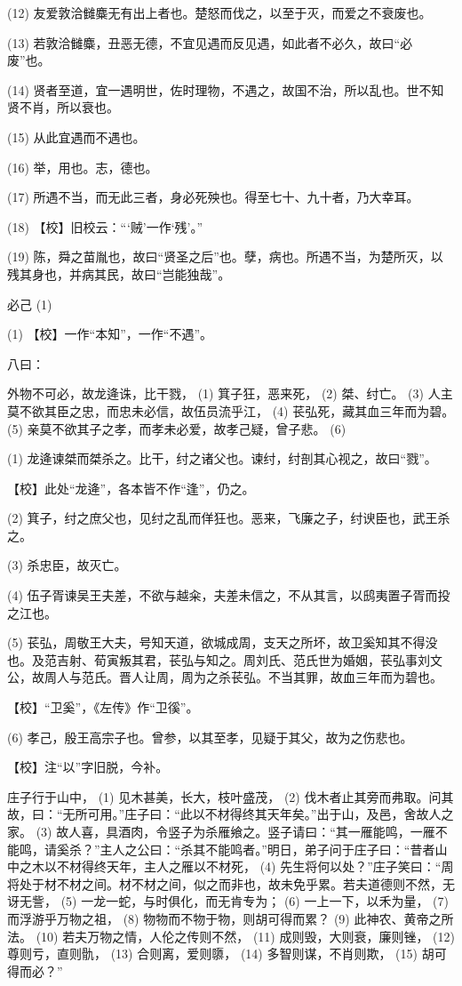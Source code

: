 \documentclass[12pt,UTF8]{ctexbook}
\begin{document}
(12) 友爱敦洽雠麋无有出上者也。楚怒而伐之，以至于灭，而爱之不衰废也。

(13) 若敦洽雠麋，丑恶无德，不宜见遇而反见遇，如此者不必久，故曰“必废”也。

(14) 贤者至道，宜一遇明世，佐时理物，不遇之，故国不治，所以乱也。世不知贤不肖，所以衰也。

(15) 从此宜遇而不遇也。

(16) 举，用也。志，德也。

(17) 所遇不当，而无此三者，身必死殃也。得至七十、九十者，乃大幸耳。

(18) 【校】旧校云：“‘贼’一作‘残’。”

(19) 陈，舜之苗胤也，故曰“贤圣之后”也。孽，病也。所遇不当，为楚所灭，以残其身也，并病其民，故曰“岂能独哉”。





必己 (1)


(1) 【校】一作“本知”，一作“不遇”。

八曰：

外物不可必，故龙逄诛，比干戮， (1) 箕子狂，恶来死， (2) 桀、纣亡。 (3) 人主莫不欲其臣之忠，而忠未必信，故伍员流乎江， (4) 苌弘死，藏其血三年而为碧。 (5) 亲莫不欲其子之孝，而孝未必爱，故孝己疑，曾子悲。 (6)

(1) 龙逄谏桀而桀杀之。比干，纣之诸父也。谏纣，纣剖其心视之，故曰“戮”。

【校】此处“龙逄”，各本皆不作“逢”，仍之。

(2) 箕子，纣之庶父也，见纣之乱而佯狂也。恶来，飞廉之子，纣谀臣也，武王杀之。

(3) 杀忠臣，故灭亡。

(4) 伍子胥谏吴王夫差，不欲与越籴，夫差未信之，不从其言，以鸱夷置子胥而投之江也。

(5) 苌弘，周敬王大夫，号知天道，欲城成周，支天之所坏，故卫奚知其不得没也。及范吉射、荀寅叛其君，苌弘与知之。周刘氏、范氏世为婚姻，苌弘事刘文公，故周人与范氏。晋人让周，周为之杀苌弘。不当其罪，故血三年而为碧也。

【校】“卫奚”，《左传》作“卫徯”。

(6) 孝己，殷王高宗子也。曾参，以其至孝，见疑于其父，故为之伤悲也。

【校】注“以”字旧脱，今补。

庄子行于山中， (1) 见木甚美，长大，枝叶盛茂， (2) 伐木者止其旁而弗取。问其故，曰：“无所可用。”庄子曰：“此以不材得终其天年矣。”出于山，及邑，舍故人之家。 (3) 故人喜，具酒肉，令竖子为杀雁飨之。竖子请曰：“其一雁能鸣，一雁不能鸣，请奚杀？”主人之公曰：“杀其不能鸣者。”明日，弟子问于庄子曰：“昔者山中之木以不材得终天年，主人之雁以不材死， (4) 先生将何以处？”庄子笑曰：“周将处于材不材之间。材不材之间，似之而非也，故未免乎累。若夫道德则不然，无讶无訾， (5) 一龙一蛇，与时俱化，而无肯专为； (6) 一上一下，以禾为量， (7) 而浮游乎万物之祖， (8) 物物而不物于物，则胡可得而累？ (9) 此神农、黄帝之所法。 (10) 若夫万物之情，人伦之传则不然， (11) 成则毁，大则衰，廉则锉， (12) 尊则亏，直则骩， (13) 合则离，爱则隳， (14) 多智则谋，不肖则欺， (15) 胡可得而必？”
\end{document}
